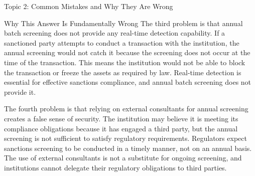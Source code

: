 \documentclass[8pt]{beamer}  %
\begin{document}
\begin{frame}{Topic 2: Common Mistakes and Why They Are Wrong}
\begin{block}{\large Why This Answer Is Fundamentally Wrong}
			The third problem is that annual batch screening does not provide any real-time detection capability. If a sanctioned party attempts to conduct a transaction with the institution, the annual screening would not catch it because the screening does not occur at the time of the transaction. This means the institution would not be able to block the transaction or freeze the assets as required by law. Real-time detection is essential for effective sanctions compliance, and annual batch screening does not provide it.
			
			The fourth problem is that relying on external consultants for annual screening creates a false sense of security. The institution may believe it is meeting its compliance obligations because it has engaged a third party, but the annual screening is not sufficient to satisfy regulatory requirements. Regulators expect sanctions screening to be conducted in a timely manner, not on an annual basis. The use of external consultants is not a substitute for ongoing screening, and institutions cannot delegate their regulatory obligations to third parties.
		\end{block}
	\end{frame}
	
\end{document}
